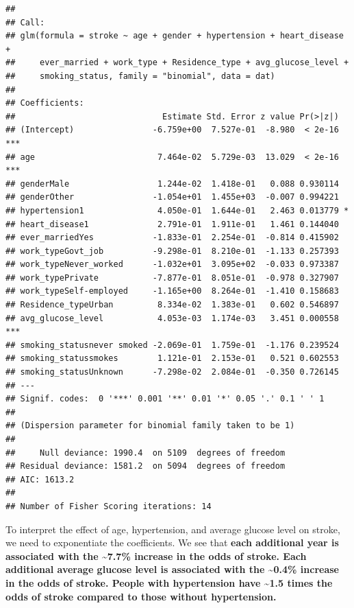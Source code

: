 \documentclass[
]{article}
\newenvironment{Shaded}{\begin{snugshade}}{\end{snugshade}}
\newcommand{\FunctionTok}[1]{\textcolor[rgb]{0.13,0.29,0.53}{\textbf{#1}}}
\newcommand{\NormalTok}[1]{#1}
\newcommand{\OtherTok}[1]{\textcolor[rgb]{0.56,0.35,0.01}{#1}}
\newcommand{\SpecialCharTok}[1]{\textcolor[rgb]{0.81,0.36,0.00}{\textbf{#1}}}
\newcommand{\StringTok}[1]{\textcolor[rgb]{0.31,0.60,0.02}{#1}}
\begin{document}
\begin{verbatim}
## 
## Call:
## glm(formula = stroke ~ age + gender + hypertension + heart_disease + 
##     ever_married + work_type + Residence_type + avg_glucose_level + 
##     smoking_status, family = "binomial", data = dat)
## 
## Coefficients:
##                              Estimate Std. Error z value Pr(>|z|)    
## (Intercept)                -6.759e+00  7.527e-01  -8.980  < 2e-16 ***
## age                         7.464e-02  5.729e-03  13.029  < 2e-16 ***
## genderMale                  1.244e-02  1.418e-01   0.088 0.930114    
## genderOther                -1.054e+01  1.455e+03  -0.007 0.994221    
## hypertension1               4.050e-01  1.644e-01   2.463 0.013779 *  
## heart_disease1              2.791e-01  1.911e-01   1.461 0.144040    
## ever_marriedYes            -1.833e-01  2.254e-01  -0.814 0.415902    
## work_typeGovt_job          -9.298e-01  8.210e-01  -1.133 0.257393    
## work_typeNever_worked      -1.032e+01  3.095e+02  -0.033 0.973387    
## work_typePrivate           -7.877e-01  8.051e-01  -0.978 0.327907    
## work_typeSelf-employed     -1.165e+00  8.264e-01  -1.410 0.158683    
## Residence_typeUrban         8.334e-02  1.383e-01   0.602 0.546897    
## avg_glucose_level           4.053e-03  1.174e-03   3.451 0.000558 ***
## smoking_statusnever smoked -2.069e-01  1.759e-01  -1.176 0.239524    
## smoking_statussmokes        1.121e-01  2.153e-01   0.521 0.602553    
## smoking_statusUnknown      -7.298e-02  2.084e-01  -0.350 0.726145    
## ---
## Signif. codes:  0 '***' 0.001 '**' 0.01 '*' 0.05 '.' 0.1 ' ' 1
## 
## (Dispersion parameter for binomial family taken to be 1)
## 
##     Null deviance: 1990.4  on 5109  degrees of freedom
## Residual deviance: 1581.2  on 5094  degrees of freedom
## AIC: 1613.2
## 
## Number of Fisher Scoring iterations: 14
\end{verbatim}

To interpret the effect of age, hypertension, and average glucose level
on stroke, we need to exponentiate the coefficients. We see that
\textbf{each additional year is associated with the \textasciitilde7.7\%
increase in the odds of stroke. Each additional average glucose level is
associated with the \textasciitilde0.4\% increase in the odds of stroke.
People with hypertension have \textasciitilde1.5 times the odds of
stroke compared to those without hypertension.}

\begin{Shaded}
\end{Shaded}
\end{document}
